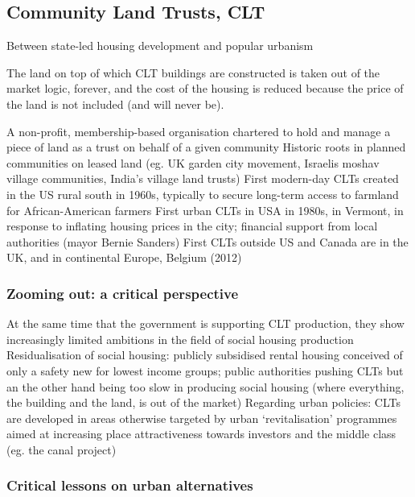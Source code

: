 \documentclass{article}
\begin{document}
\subsection{Community Land Trusts, CLT}

Between state-led housing development and popular urbanism

The land on top of which CLT buildings are constructed is taken out of the market logic, forever, and the cost of the housing is reduced because the price of the land is not included (and will never be).

\begin{outline}
	\1 A non-profit, membership-based organisation chartered to hold and manage a piece of land as a trust on behalf of a given community
	\1 Historic roots in planned communities on leased land (eg. UK garden city movement, Israelis moshav village communities, India's village land trusts)
	\1 First modern-day CLTs created in the US rural south in 1960s, typically to secure long-term access to farmland for African-American farmers
	\1 First urban CLTs in USA in 1980s, in Vermont, in response to inflating housing prices in the city; financial support from local authorities (mayor Bernie Sanders)
	\1 First CLTs outside US and Canada are in the UK, and in continental Europe, Belgium (2012)
\end{outline}

\subsubsection{Zooming out: a critical perspective}

\begin{outline}
	\1 At the same time that the government is supporting CLT production, they show increasingly limited ambitions in the field of social housing production
	\1 Residualisation of social housing: publicly subsidised rental housing conceived of only a safety new for lowest income groups; public authorities pushing CLTs but an the other hand being too slow in producing social housing (where everything, the building and the land, is out of the market)
	\1 Regarding urban policies:
		\2 CLTs are developed in areas otherwise targeted by urban `revitalisation' programmes aimed at increasing place attractiveness towards investors and the middle class (eg. the canal project)
\end{outline}

\subsubsection{Critical lessons on urban alternatives}
\end{document}
